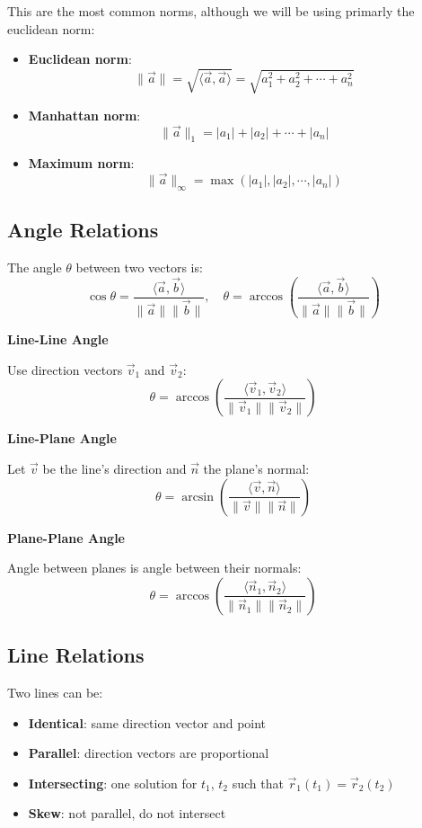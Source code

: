This are the most common norms, although we will be using primarly the euclidean norm:

\begin{itemize}[label=\(-\)]
	\item \textbf{Euclidean norm}:
	      \[
		      \|\vec{a}\| = \sqrt{\langle\vec{a}, \vec{a}\rangle} = \sqrt{a_1^2 + a_2^2 + \cdots + a_n^2}
	      \]
	\item \textbf{Manhattan norm}:
	      \[
		      \|\vec{a}\|_1 = |a_1| + |a_2| + \cdots + |a_n|
	      \]
	\item \textbf{Maximum norm}:
	      \[
		      \|\vec{a}\|_\infty = \max(|a_1|, |a_2|, \cdots , |a_n|)
	      \]
\end{itemize}

\subsection{Angle Relations}
The angle \(\theta\) between two vectors is:
\[
	\cos\theta = \frac{\langle\vec{a}, \vec{b}\rangle}{\|\vec{a}\|\|\vec{b}\|}, \quad \theta = \arccos\left( \frac{\langle\vec{a}, \vec{b}\rangle}{\|\vec{a}\|\|\vec{b}\|} \right)
\]

\textbf{Line-Line Angle}

Use direction vectors \(\vec{v}_1\) and \(\vec{v}_2\):
\[
	\theta = \arccos\left( \frac{\langle\vec{v}_1, \vec{v}_2\rangle}{\|\vec{v}_1\|\|\vec{v}_2\|} \right)
\]

\textbf{Line-Plane Angle}

Let \(\vec{v}\) be the line's direction and \(\vec{n}\) the plane's normal:
\[
	\theta = \arcsin\left( \frac{\langle\vec{v}, \vec{n}\rangle}{\|\vec{v}\|\|\vec{n}\|} \right)
\]

\textbf{Plane-Plane Angle}

Angle between planes is angle between their normals:
\[
	\theta = \arccos\left( \frac{\langle\vec{n}_1, \vec{n}_2\rangle}{\|\vec{n}_1\|\|\vec{n}_2\|} \right)
\]

\subsection{Line Relations}
Two lines can be:

\begin{itemize}[label=\(-\)]
	\item \textbf{Identical}: same direction vector and point
	\item \textbf{Parallel}: direction vectors are proportional
	\item \textbf{Intersecting}: one solution for \(t_1\), \(t_2\) such that \(\vec{r}_1(t_1) = \vec{r}_2(t_2)\)
	\item \textbf{Skew}: not parallel, do not intersect
\end{itemize}


